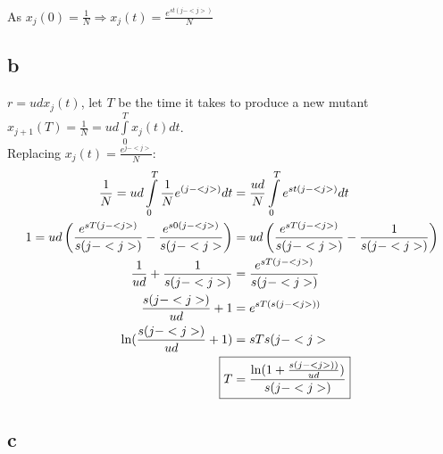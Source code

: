 As $x_j(0) = \frac{1}{N} \Rightarrow \boxed{x_j(t) = \frac{e^{st(j-<j>)}}{N}} $

\subsection{b}

$r = udx_j(t)$, let $T$ be the time it takes to produce a new mutant $x_{j+1}(T) = \frac{1}{N} = ud\int\limits_{0}^{T} x_j(t)dt$.\\
Replacing $x_j(t) = \frac{e^{j-<j>}}{N} : $
\begin{align*}
\frac{1}{N} = ud\int\limits_{0}^{T} \frac{1}{N}e^{(j-<j>)}dt &= \frac{ud}{N}\int\limits_{0}^{T} e^{st(j-<j>)}dt\\
1 = ud\left(\frac{e^{sT(j-<j>)}}{s(j-<j>)}-\frac{e^{s0(j-<j>)}}{s(j-<j>}\right) &= ud\left( \frac{e^{sT(j-<j>)}}{s(j-<j>)} - \frac{1}{s(j-<j>)}\right)\\
 \frac{1}{ud}+\frac{1}{s(j-<j>)} &= \frac{e^{sT(j-<j>)}}{s(j-<j>)}\\
 \frac{s(j-<j>)}{ud}+1 &= e^{sT(s(j-<j>))}\\
 \ln (\frac{s(j-<j>)}{ud}+1) &= sTs(j-<j>\\
 \Aboxed{T &= \frac{\ln(1+\frac{s(j-<j>))}{ud})}{s(j-<j>)}}
\end{align*}

\subsection{c}




